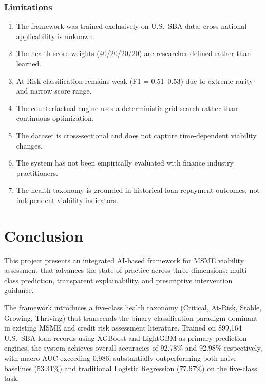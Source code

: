 \documentclass[12pt,a4paper]{report}
\begin{document}
\subsection{Limitations}

\begin{enumerate}
    \item The framework was trained exclusively on U.S.\ SBA data; cross-national applicability is unknown.
    \item The health score weights (40/20/20/20) are researcher-defined rather than learned.
    \item At-Risk classification remains weak (F1 = 0.51--0.53) due to extreme rarity and narrow score range.
    \item The counterfactual engine uses a deterministic grid search rather than continuous optimization.
    \item The dataset is cross-sectional and does not capture time-dependent viability changes.
    \item The system has not been empirically evaluated with finance industry practitioners.
    \item The health taxonomy is grounded in historical loan repayment outcomes, not independent viability indicators.
\end{enumerate}


\chapter{Conclusion}

This project presents an integrated AI-based framework for MSME viability assessment that advances the state of practice across three dimensions: multi-class prediction, transparent explainability, and prescriptive intervention guidance.

The framework introduces a five-class health taxonomy (Critical, At-Risk, Stable, Growing, Thriving) that transcends the binary classification paradigm dominant in existing MSME and credit risk assessment literature. Trained on 899,164 U.S.\ SBA loan records using XGBoost and LightGBM as primary prediction engines, the system achieves overall accuracies of 92.78\% and 92.98\% respectively, with macro AUC exceeding 0.986, substantially outperforming both naive baselines (53.31\%) and traditional Logistic Regression (77.67\%) on the five-class task.
\end{document}
